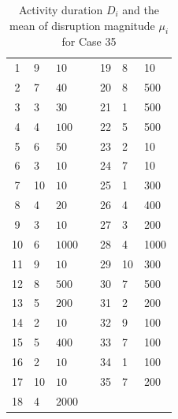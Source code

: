 \documentclass[11pt]{article}
\begin{document}
\begin{itemize}
\begin{table}[H]
\begin{tabular}{ c | l | l l c| l | l}
				\cline{1-3}\cline{5-7}
				1 & 9 & \(10\) & & 19 & 8 & 10\\ 
				2 & 7 & \(40\) & & 20 & 8 & 500\\ 
				3 & 3 & \(30\) & & 21 & 1 & 500\\ 
				4 & 4 & \(100\) & & 22 & 5 & 500\\ 
				5 & 6 & \(50\) & & 23 & 2 & 10\\ 
				6 & 3 & \(10\) & & 24 & 7 & 10 \\ 
				7 & 10 & \(10\) & & 25 & 1 & 300 \\ 
				8 & 4 & \(20\) & & 26 & 4 & 400 \\ 
				9 & 3 & \(10\) & & 27 & 3 & 200 \\ 
				10 & 6 & \(1000\) & & 28 & 4 & 1000 \\ 
				11 & 9 & \(10\) & & 29 & 10 & 300\\ 
				12 & 8 & \(500\) & & 30 & 7 & 500\\ 
				13 & 5 & \(200\) & & 31 & 2 & 200\\ 
				14 & 2 & \(10\) & & 32 & 9 & 100\\ 
				15 & 5 & \(400\) & & 33 & 7 & 100\\ 
				16 & 2 & \(10\) & & 34 & 1 & 100 \\ 
				17 & 10 & \(10\) & & 35 & 7 & 200 \\ 
				18 & 4 & \(2000\) & & & & \\ 
				\cline{1-3}\cline{5-7}
			\end{tabular}
			\caption{Activity duration \(D_i\) and the mean of disruption magnitude \(\mu_i\) for Case 35}
			\label{table:case35}
		\end{table}
	\end{itemize}
	
\end{document}
